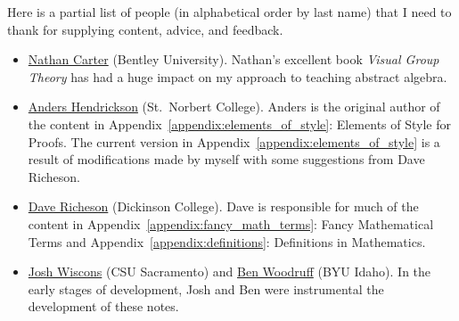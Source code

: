 \documentclass[12pt,oneside]{book}
\theoremstyle{definition}
\begin{document}
\noindent Here is a partial list of people (in alphabetical order by last name) that I need to thank for supplying content, advice, and feedback.
\begin{itemize}
\item \href{https://faculty.bentley.edu/details.asp?uname=ncarter}{Nathan Carter} (Bentley University). Nathan's excellent book \emph{Visual Group Theory} has had a huge impact on my approach to teaching abstract algebra.
\item \href{http://home.snc.edu/andershendrickson/}{Anders Hendrickson} (St.~Norbert College). Anders is the original author of the content in Appendix~\ref{appendix:elements_of_style}: Elements of Style for Proofs. The current version in Appendix~\ref{appendix:elements_of_style} is a result of modifications made by myself with some suggestions from Dave Richeson.
\item \href{http://users.dickinson.edu/~richesod/}{Dave Richeson} (Dickinson College). Dave is responsible for much of the content in Appendix~\ref{appendix:fancy_math_terms}: Fancy Mathematical Terms and Appendix~\ref{appendix:definitions}: Definitions in Mathematics. 
\item \href{http://webpages.csus.edu/wiscons/}{Josh Wiscons} (CSU Sacramento) and \href{http://emp.byui.edu/woodruffb/}{Ben Woodruff} (BYU Idaho). In the early stages of development, Josh and Ben were instrumental the development of these notes.
\end{itemize}

\tableofcontents












\end{document}
